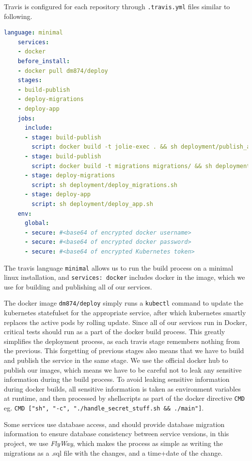 \medskip

Travis is configured for each repository through \texttt{.travis.yml} files similar to following.

\begin{lstlisting}[language=yaml]
    language: minimal
    services:
    - docker
    before_install:
    - docker pull dm874/deploy
    stages:
    - build-publish
    - deploy-migrations
    - deploy-app
    jobs:
      include:
      - stage: build-publish
        script: docker build -t jolie-exec . && sh deployment/publish_app.sh
      - stage: build-publish
        script: docker build -t migrations migrations/ && sh deployment/publish_migrations.sh
      - stage: deploy-migrations
        script: sh deployment/deploy_migrations.sh
      - stage: deploy-app
        script: sh deployment/deploy_app.sh
    env:
      global:
      - secure: #<base64 of encrypted docker username>
      - secure: #<base64 of encrypted docker password>
      - secure: #<base64 of encrypted Kubernetes token>
\end{lstlisting}

The travis language \texttt{minimal} allows us to run the build process on a minimal linux installation, and \texttt{services: docker} includes docker in the image, which we use for building and publishing all of our services.

The docker image \texttt{dm874/deploy} simply runs a \texttt{kubectl} command to update the kubernetes statefulset for the appropriate service, after which kubernetes smartly replaces the active pods by rolling update.
Since all of our services run in Docker, critical tests should run as a part of the docker build process.
This greatly simplifies the deployment process, as each travis stage remembers nothing from the previous. 
This forgetting of previous stages also means that we have to build and publish the service in the same stage. We use the official docker hub to publish our images, which means we have to be careful not to leak any sensitive information during the build process.
To avoid leaking sensitive information during docker builds, all sensitive information is taken as environment variables at runtime, and then processed by shellscripts as part of the docker directive \texttt{CMD} eg. \lstinline{CMD ["sh", "-c", "./handle_secret_stuff.sh && ./main"]}.

Some services use database access, and should provide database migration information to ensure database consistency between service versions, in this project, we use \textit{FlyWay}, which makes the process as simple as writing the migrations as a .sql file with the changes, and a time+date of the change.

